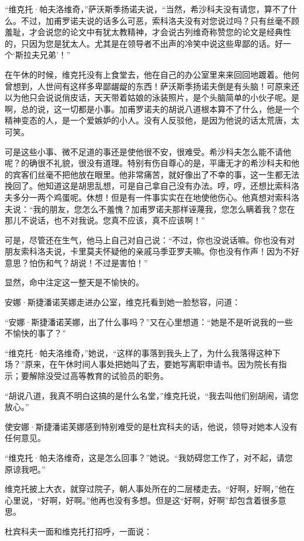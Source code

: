 “维克托·帕夫洛维奇，”萨沃斯季扬诺夫说，“当然，希沙科夫没有请您，算不了什么。不过，加甫罗诺夫说的话多么可恶，索科洛夫没有对您说过吗？只有丝毫不顾羞耻，才会说您的论文中有犹太教精神，才会说古列维奇称赞您的论文是经典性的，只因为您是犹太人。尤其是在领导者不出声的冷笑中说这些卑鄙的话。好一个‘斯拉夫兄弟’！”

在午休的时候，维克托没有上食堂去，他在自己的办公室里来来回回地踱着。他何曾想到，人世间有这样多卑鄙龌龊的东西！萨沃斯季扬诺夫倒是有头脑！可原来还以为他只会说说俏皮话，天天带着姑娘的泳装照片，是个头脑简单的小伙子呢。是啊，总的说，这一切都是小事。加甫罗诺夫的胡说八道根本算不了什么，他是一个精神变态的人，是一个爱嫉妒的小人。没有人反驳他，是因为他说的话太荒唐，太可笑。

可是这些小事、微不足道的事还是使他很不安，很难受。希沙科夫怎么能不请他呢？的确很不礼貌，很没有道理。特别有伤自尊心的是，平庸无才的希沙科夫和他的宾客们丝毫不把他放在眼里。他非常痛苦，就好像出了不幸的事，这一生都无法挽回了。他知道这是胡思乱想，可是自己拿自己没有办法。哼，哼，还想比索科洛夫多分一两个鸡蛋呢。休想！但是有一件事实实在在地使他伤心。他真想对索科洛夫说：“我的朋友，您怎么不羞愧？加甫罗诺夫那样诬蔑我，您怎么瞒着我？您在那儿不说话，也不对我说。您真不应该，真不应该啊！”

可是，尽管还在生气，他马上自己对自己说：“不过，你也没说话嘛。你也没有对朋友索科洛夫说，卡里莫夫怀疑他的亲戚马季亚罗夫嘛。你也没有作声！因为不好意思？怕伤和气？胡说！不过是害怕！”

显然，命中注定这一整天是不愉快的。

安娜·斯捷潘诺芙娜走进办公室，维克托看到她一脸愁容，问道：

“安娜·斯捷潘诺芙娜，出了什么事吗？”又在心里想道：“她是不是听说我的一些不愉快的事了？”

“维克托·帕夫洛维奇，”她说，“这样的事落到我头上了，为什么我落得这种下场？”原来，在午休时间人事处把她叫了去，要她写离职申请书。因为院长有指示；要解除没受过高等教育的试验员的职务。

“胡说八道，我真不明白这搞的是什么名堂，”维克托说，“我去叫他们别胡闹，请您放心。”

使安娜·斯捷潘诺芙娜感到特别难受的是杜宾科夫的话，他说，领导对她本人没有任何意见。

“维克托·帕夫洛维奇，这是怎么回事？”她说。“我妨碍您工作了，对不起，请您原谅我吧。”

维克托披上大衣，就穿过院子，朝人事处所在的二层楼走去。“好啊，好啊，”他在心里说，“好啊，好啊。”他再也没有多想。但是这“好啊，好啊”却包含着很多意思。

杜宾科夫一面和维克托打招呼，一面说：

